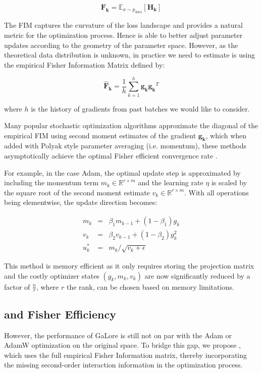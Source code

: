 \[
\mathbf{F_{k}} = \mathbb{E}_{x \sim p_{\text{data}}} \left[ \mathbf{H_{k}} \right]
\]

The FIM captures the curvature of the loss landscape and provides a natural metric for the optimization process. Hence is able to better adjust parameter updates according to the geometry of the parameter space. However, as the theoretical data distribution is unknown, in practice we need to estimate is using the empirical Fisher Information Matrix \citep{martensNewPerspectiveNatural2014} defined by:

\[
\mathbf{\hat{F}_{k}} = \frac{1}{h} \sum_{k=1}^{h} \mathbf{g_{k}} \mathbf{g_{k}}^{T}
\]

where \(h\) is the history of gradients from past batches we would like to consider.

Many popular stochastic optimization algorithms approximate the diagonal of the empirical FIM using second moment estimates of the gradient \(\mathbf{g_{k}}\), which when added with Polyak style parameter averaging (i.e. momentum), these methods asymptotically achieve the optimal Fisher efficient convergence rate \citep{martens2020new}.

For example, in the case Adam, the optimal update step is approximated by including the momentum term \(m_{k} \in \mathbb{R}^{r\times m}\) and the learning rate \(\eta\) is scaled by the square root of the second moment estimate \(v_{k} \in \mathbb{R}^{r\times m}\). With all operations being elementwise, the update direction becomes:

\begin{eqnarray}
    m_{k} &=& \beta_{1} m_{k-1} + (1-\beta_{1}) g_{k} \\
    v_{k} &=& \beta_{2} v_{k-1} + (1-\beta_2) g^{2}_{k}  \\
    u^*_{k} &=& m_{k} / \sqrt{v_{k} + \epsilon}
\end{eqnarray}

This method is memory efficient as it only requires storing the projection matrix and the costly optimizer states \(\left(g_{k}, m_{k}, v_{k}\right)\) are now significantly reduced by a factor of \(\frac{n}{r}\), where \(r\) the rank, can be chosen based on memory limitations.

\subsection{\lowrank and Fisher Efficiency}

However, the performance of GaLore is still not on par with the Adam or AdamW optimization on the original space. To bridge this gap, we propose \lowrank, which uses the full empirical Fisher Information matrix, thereby incorporating the missing second-order interaction information in the optimization process.

